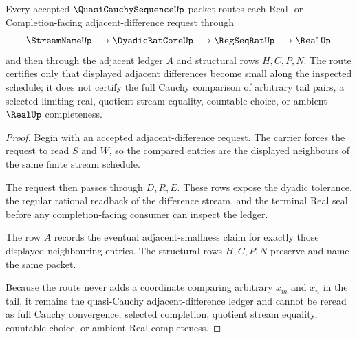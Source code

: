 \begin{theorem}
\label{thm:quasi-cauchy-sequence-adjacent-difference-ledger}
Every accepted $\QuasiCauchySequenceUp$ packet routes each Real- or Completion-facing adjacent-difference request through
$$
\StreamNameUp \longrightarrow \DyadicRatCoreUp \longrightarrow \RegSeqRatUp \longrightarrow \RealUp
$$
and then through the adjacent ledger $A$ and structural rows $H,C,P,N$. The route certifies only that displayed adjacent differences become small along the inspected schedule; it does not certify the full Cauchy comparison of arbitrary tail pairs, a selected limiting real, quotient stream equality, countable choice, or ambient $\RealUp$ completeness.
\end{theorem}
\begin{proof}
Begin with an accepted adjacent-difference request. The carrier forces the request to read $S$ and $W$, so the compared entries are the displayed neighbours of the same finite stream schedule.

The request then passes through $D,R,E$. These rows expose the dyadic tolerance, the regular rational readback of the difference stream, and the terminal Real seal before any completion-facing consumer can inspect the ledger.

The row $A$ records the eventual adjacent-smallness claim for exactly those displayed neighbouring entries. The structural rows $H,C,P,N$ preserve and name the same packet.

Because the route never adds a coordinate comparing arbitrary $x_m$ and $x_n$ in the tail, it remains the quasi-Cauchy adjacent-difference ledger and cannot be reread as full Cauchy convergence, selected completion, quotient stream equality, countable choice, or ambient Real completeness.
\end{proof}




